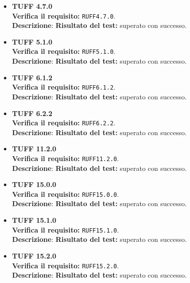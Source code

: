 \begin{itemize}
\item \textbf{TUFF 4.7.0}\\
\textbf{Verifica il requisito:} \texttt{RUFF4.7.0}.\\
\textbf{Descrizione}: %
\textbf{Risultato del test:} superato con successo.

\item \textbf{TUFF 5.1.0}\\
\textbf{Verifica il requisito:} \texttt{RUFF5.1.0}.\\
\textbf{Descrizione}: %
\textbf{Risultato del test:} superato con successo.

\item \textbf{TUFF 6.1.2}\\
\textbf{Verifica il requisito:} \texttt{RUFF6.1.2}.\\
\textbf{Descrizione}: %
\textbf{Risultato del test:} superato con successo.

\item \textbf{TUFF 6.2.2}\\
\textbf{Verifica il requisito:} \texttt{RUFF6.2.2}.\\
\textbf{Descrizione}: %
\textbf{Risultato del test:} superato con successo.

\item \textbf{TUFF 11.2.0}\\
\textbf{Verifica il requisito:} \texttt{RUFF11.2.0}.\\
\textbf{Descrizione}: %
\textbf{Risultato del test:} superato con successo.

\item \textbf{TUFF 15.0.0}\\
\textbf{Verifica il requisito:} \texttt{RUFF15.0.0}.\\
\textbf{Descrizione}: %
\textbf{Risultato del test:} superato con successo.

\item \textbf{TUFF 15.1.0}\\
\textbf{Verifica il requisito:} \texttt{RUFF15.1.0}.\\
\textbf{Descrizione}: %
\textbf{Risultato del test:} superato con successo.

\item \textbf{TUFF 15.2.0}\\
\textbf{Verifica il requisito:} \texttt{RUFF15.2.0}.\\
\textbf{Descrizione}: %
\textbf{Risultato del test:} superato con successo.


\end{itemize}
